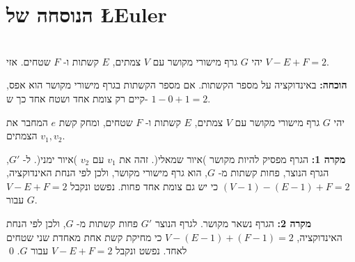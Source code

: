 

\section{הנוסחה של
\L{Euler}}

\begin{theorem}[\L{Euler}]\label{thm.euler}\mbox{}\\
יהי
$G$
גרף מישורי מקושר עם
$V$
צמתים,
$E$
קשתות ו-%
$F$
שטחים. אזי
$V-E+F=2$.
\end{theorem}

\textbf{הוכחה:}
באינדוקציה על מספר הקשתות. אם מספר הקשתות בגרף מישורי מקושר הוא אפס, קיים רק צומת אחד ושטח אחד כך ש-%
$1-0+1=2$.

יהי 
$G$
גרף מישורי מקושר עם 
$V$
צמתים, 
$E$
קשתות ו-%
$F$
שטחים, ומחק קשת 
$e$
המחבר את הצמתים
$v_1,v_2$.


\textbf{מקרה 1:}
הגרף מפסיק להיות מקושר )איור שמאלי(. זהה את
$v_1$
עם
$v_2$
)איור ימני(.
ל-%
$G'$,
הגרף הנוצר, פחות קשתות מ-%
$G$,
הוא גרף מישורי מקושר,
ולכן לפי הנחת האינדוקציה,
$(V-1)-(E-1)+F=2$
כי יש גם צומת אחד פחות. נפשט ונקבל
$V-E+F=2$
עבור
$G$.

\begin{center}

\end{center}

\textbf{מקרה 2:}
הגרף נשאר מקושר. לגרף הנוצר
$G'$
פחות קשתות מ-%
$G$,
ולכן לפי הנחת האינדוקציה,
$V-(E-1)+(F-1)=2$
כי מחיקת קשת אחת מאחדת שני שטחים לאחד. נפשט ונקבל
$V-E+F=2$ 
עבור
$G$.
\qed

